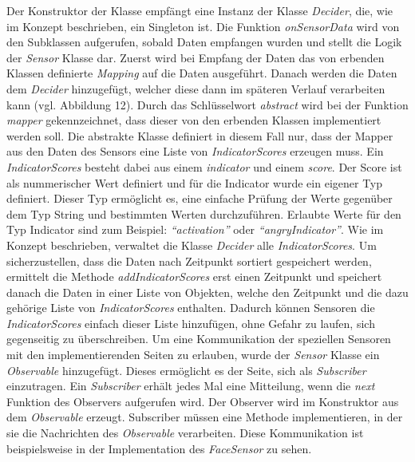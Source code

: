 Der Konstruktor der Klasse empfängt eine Instanz der Klasse \textit{Decider}, die, wie im Konzept beschrieben, ein Singleton ist. Die Funktion \textit{onSensorData} wird von den Subklassen aufgerufen, sobald Daten empfangen wurden und stellt die Logik der \textit{Sensor} Klasse dar. Zuerst wird bei Empfang der Daten das von erbenden Klassen definierte \textit{Mapping} auf die Daten ausgeführt. Danach werden die Daten dem \textit{Decider} hinzugefügt, welcher diese dann im späteren Verlauf verarbeiten kann (vgl. Abbildung 12). Durch das Schlüsselwort \textit{abstract} wird bei der Funktion \textit{mapper} gekennzeichnet, dass dieser von den erbenden Klassen implementiert werden soll. Die abstrakte Klasse definiert in diesem Fall nur, dass der Mapper aus den Daten des Sensors eine Liste von \textit{IndicatorScores} erzeugen muss. Ein \textit{IndicatorScores} besteht dabei aus einem \textit{indicator} und einem \textit{score}. Der Score ist als nummerischer Wert definiert und für die Indicator wurde ein eigener Typ definiert. Dieser Typ ermöglicht es, eine einfache Prüfung der Werte gegenüber dem Typ String und bestimmten Werten durchzuführen. Erlaubte Werte für den Typ Indicator sind zum Beispiel: \textit{``activation''} oder \textit{``angryIndicator''}.\newline
Wie im Konzept beschrieben, verwaltet die Klasse \textit{Decider} alle \textit{IndicatorScores}. Um sicherzustellen, dass die Daten nach Zeitpunkt sortiert gespeichert werden, ermittelt die Methode \textit{addIndicatorScores} erst einen Zeitpunkt und speichert danach die Daten in einer Liste von Objekten, welche den Zeitpunkt und die dazu gehörige Liste von \textit{IndicatorScores} enthalten. Dadurch können Sensoren die \textit{IndicatorScores} einfach dieser Liste hinzufügen, ohne Gefahr zu laufen, sich gegenseitig zu überschreiben.\newline
Um eine Kommunikation der speziellen Sensoren mit den implementierenden Seiten zu erlauben, wurde der \textit{Sensor} Klasse ein \textit{Observable} hinzugefügt. Dieses ermöglicht es der Seite, sich als \textit{Subscriber} einzutragen. Ein \textit{Subscriber} erhält jedes Mal eine Mitteilung, wenn die \textit{next} Funktion des Observers aufgerufen wird. Der Observer wird im Konstruktor aus dem \textit{Observable} erzeugt. Subscriber müssen eine Methode implementieren, in der sie die Nachrichten des \textit{Observable} verarbeiten. Diese Kommunikation ist beispielsweise in der Implementation des \textit{FaceSensor} zu sehen.
